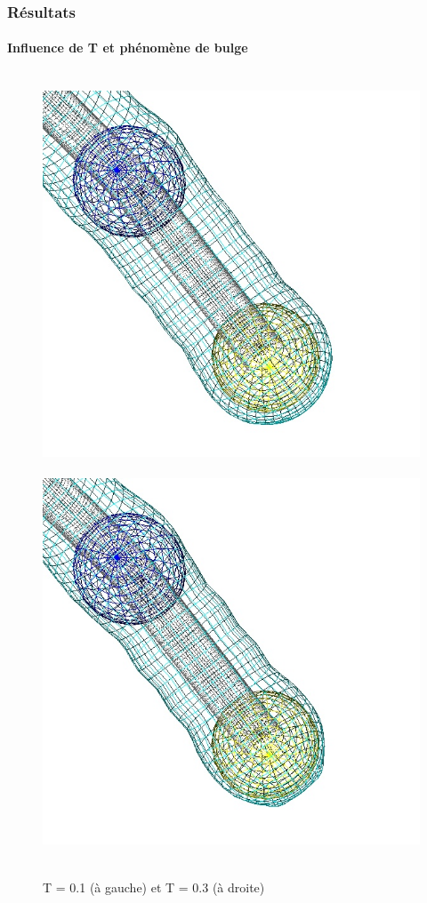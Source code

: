\documentclass[9pt]{beamer}
\begin{document}
\begin{frame}
	\frametitle{Résultats}
	\framesubtitle{Influence de T et phénomène de bulge}
	
	\begin{figure}[H]
		\centering
		\leavevmode
  		\hbox{
  			\includegraphics[scale=0.3]{images/evolution_t01.jpg}
  			\hspace*{0.5cm} 
     		\includegraphics[scale=0.3]{images/evolution_t03.jpg}
     		\hspace*{0.5cm}  
  		}
  		\caption{T = 0.1 (à gauche) et T = 0.3 (à droite)}
	\end{figure}
\end{frame}
\end{document}
